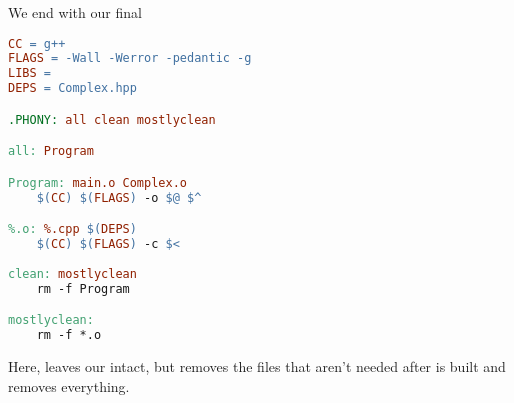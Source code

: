 We end with our final 
\begin{lstlisting}[language=make]
CC = g++
FLAGS = -Wall -Werror -pedantic -g
LIBS = 
DEPS = Complex.hpp

.PHONY: all clean mostlyclean

all: Program

Program: main.o Complex.o
	$(CC) $(FLAGS) -o $@ $^

%.o: %.cpp $(DEPS)
	$(CC) $(FLAGS) -c $<
	
clean: mostlyclean
	rm -f Program

mostlyclean:
	rm -f *.o
\end{lstlisting}

Here,  leaves our  intact, but removes the  files that aren't needed after  is built and  removes everything.